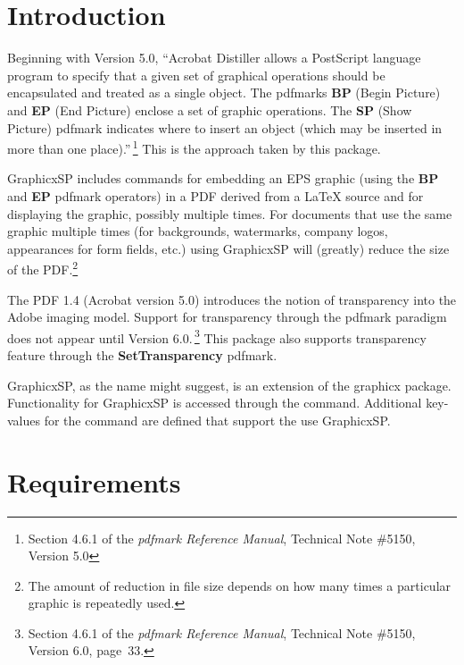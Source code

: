 \documentclass{article}
\let\pkg\textsf
\begin{document}
\maketitle

\tableofcontents
{}

\section{Introduction}

Beginning with Version 5.0, ``Acrobat Distiller allows a PostScript
language program to specify that a given set of graphical operations
should be encapsulated and treated as a single object. The pdfmarks
\textbf{BP} (Begin Picture) and \textbf{EP} (End Picture) enclose a
set of graphic operations. The \textbf{SP} (Show Picture) pdfmark
indicates where to insert an object (which may be inserted in more
than one place).''\,\footnote{Section 4.6.1 of the \textit{pdfmark
Reference Manual}, Technical Note \#5150, Version 5.0} This is the
approach taken by this package.

\pkg{GraphicxSP} includes commands for embedding an EPS graphic (using the
\textbf{BP} and \textbf{EP} pdfmark operators) in a PDF derived from
a {\LaTeX} source and for displaying the graphic, possibly multiple
times. For documents that use the same graphic multiple times (for
backgrounds, watermarks, company logos, appearances for form fields,
etc.) using \pkg{GraphicxSP} will (greatly) reduce the size of the
PDF.\footnote{The amount of reduction in file size depends on how
many times a particular graphic is repeatedly used.}

The PDF 1.4 (Acrobat version 5.0) introduces the notion of
transparency into the Adobe imaging model. Support for transparency
through the pdfmark paradigm does not appear until Version
6.0.\,\footnote{Section 4.6.1 of the \textit{pdfmark Reference
Manual}, Technical Note \#5150, Version 6.0, page~33.} This package
also supports transparency feature through the
\textbf{SetTransparency} pdfmark.

\pkg{GraphicxSP}, as the name might suggest, is an extension of the
graphicx package. Functionality for \pkg{GraphicxSP} is accessed through
the  command. Additional key-values for the
 command are defined that support the use
\pkg{GraphicxSP}.

\section{Requirements}
\end{document}
